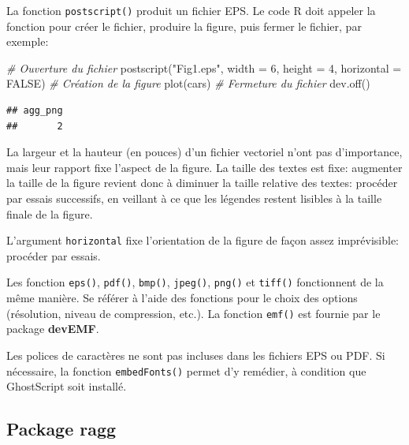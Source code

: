 \documentclass[
  11pt,
  french,
  a4paper,
  extrafontsizes,onecolumn,openright
  ]{memoir}
\newenvironment{Shaded}{\begin{snugshade}}{\end{snugshade}}
\newcommand{\AttributeTok}[1]{\textcolor[rgb]{0.77,0.63,0.00}{#1}}
\newcommand{\CommentTok}[1]{\textcolor[rgb]{0.56,0.35,0.01}{\textit{#1}}}
\newcommand{\ConstantTok}[1]{\textcolor[rgb]{0.00,0.00,0.00}{#1}}
\newcommand{\DecValTok}[1]{\textcolor[rgb]{0.00,0.00,0.81}{#1}}
\newcommand{\FunctionTok}[1]{\textcolor[rgb]{0.00,0.00,0.00}{#1}}
\newcommand{\NormalTok}[1]{#1}
\newcommand{\StringTok}[1]{\textcolor[rgb]{0.31,0.60,0.02}{#1}}
\begin{document}
La fonction \texttt{postscript()} produit un fichier EPS.
Le code R doit appeler la fonction pour créer le fichier, produire la figure, puis fermer le fichier, par exemple:

\scriptsize

\begin{Shaded}
\begin{Highlighting}[]
\CommentTok{\# Ouverture du fichier}
\FunctionTok{postscript}\NormalTok{(}\StringTok{"Fig1.eps"}\NormalTok{, }\AttributeTok{width =} \DecValTok{6}\NormalTok{, }\AttributeTok{height =} \DecValTok{4}\NormalTok{, }\AttributeTok{horizontal =} \ConstantTok{FALSE}\NormalTok{)}
\CommentTok{\# Création de la figure}
\FunctionTok{plot}\NormalTok{(cars)}
\CommentTok{\# Fermeture du fichier}
\FunctionTok{dev.off}\NormalTok{()}
\end{Highlighting}
\end{Shaded}

\begin{verbatim}
## agg_png 
##       2
\end{verbatim}

\normalsize

La largeur et la hauteur (en pouces) d'un fichier vectoriel n'ont pas d'importance, mais leur rapport fixe l'aspect de la figure.
La taille des textes est fixe: augmenter la taille de la figure revient donc à diminuer la taille relative des textes: procéder par essais successifs, en veillant à ce que les légendes restent lisibles à la taille finale de la figure.

L'argument \texttt{horizontal} fixe l'orientation de la figure de façon assez imprévisible: procéder par essais.

Les fonction \texttt{eps()}, \texttt{pdf()}, \texttt{bmp()}, \texttt{jpeg()}, \texttt{png()} et \texttt{tiff()} fonctionnent de la même manière.
Se référer à l'aide des fonctions pour le choix des options (résolution, niveau de compression, etc.).
La fonction \texttt{emf()} est fournie par le package \textbf{devEMF}.

Les polices de caractères ne sont pas incluses dans les fichiers EPS ou PDF.
Si nécessaire, la fonction \texttt{embedFonts()} permet d'y remédier, à condition que GhostScript soit installé.

\hypertarget{package-ragg}{%
\subsection{Package ragg}\label{package-ragg}}
\end{document}
